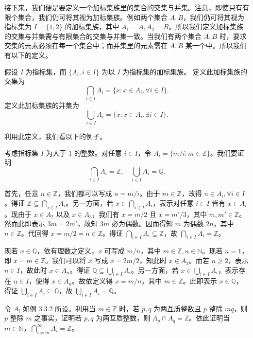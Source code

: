 接下来，我们便是要定义一个加标集族里的集合的交集与并集。注意，即使只有有限个集合，我们仍可将其视为加标集族。例如两个集合 $A, B$，我们仍可将其视为指标集为 $I = \{1, 2\}$ 的加标集族，其中 $A_1 = A, A_2 = B$。所以我们定义加标集族的交集与并集需与有限集合的交集与并集一致。当我们有两个集合 $A, B$ 时，要求交集的元素必须在每一个集合中；而并集里的元素需在 $A, B$ 某一个中。所以我们有以下的定义。

\begin{definition}
假设 $I$ 为指标集，而 $\{A_i, i \in I\}$ 为以 $I$ 为指标集的加标集族。
定义此加标集族的交集为
$$ \bigcap_{i \in I} A_i = \{x : x \in A_i, \forall i \in I\}. $$
定义此加标集族的并集为
$$ \bigcup_{i \in I} A_i = \{x : x \in A_i, \exists i \in I\}. $$
\end{definition}

利用此定义，我们看以下的例子。

\begin{example}
考虑指标集 $I$ 为大于 $1$ 的整数。对任意 $i \in I$，令 $A_i = \{m/i : m \in \mathbb{Z}\}$。我们要证明
$$ \bigcap_{i \in I} A_i = \mathbb{Z}, \quad \bigcup_{i \in I} A_i = \mathbb{Q}. $$
\end{example}
首先，任意 $n \in \mathbb{Z}$，我们都可以写成 $n = ni/i$。由于 $ni \in \mathbb{Z}$，故得 $n \in A_i, \forall i \in I$。得证 $\mathbb{Z} \subseteq \bigcap_{i \in I} A_i$。另一方面，若 $x \in \bigcap_{i \in I} A_i$，表示对任意 $i \in I$ 皆有 $x \in A_i$。现由于 $x \in A_2$ 以及 $x \in A_3$，我们有 $x = m/2$ 且 $x = m'/3$，其中 $m, m' \in \mathbb{Z}$。然而此即表示 $3m = 2m'$，故知 $3m$ 必为偶数。因而得知 $m$ 为偶数 $2n$，其中 $n \in \mathbb{Z}$。代回得 $x = m/2 = n \in \mathbb{Z}$。得证 $\bigcap_{i \in I} A_i \subseteq \mathbb{Z}$，故 $\bigcap_{i \in I} A_i = \mathbb{Z}$。

现若 $x \in \mathbb{Q}$，依有理数之定义，$x$ 可写成 $m/n$，其中 $m \in \mathbb{Z}, n \in \mathbb{N}$。现若 $n = 1$，即 $x = m \in \mathbb{Z}$。我们可以将 $x$ 写成 $x = 2m/2$，知此时 $x \in A_2$。而若 $n \geq 2$，表示 $n \in I$，故此时 $x \in A_n$。得证 $\mathbb{Q} \subseteq \bigcup_{i \in I} A_i$。另一方面，若 $x \in \bigcup_{i \in I} A_i$，表示存在 $n \in I$，使得 $x \in A_n$。故依定义得 $x = m/n$，其中 $m \in \mathbb{Z}$。此即表示 $x \in \mathbb{Q}$，得证 $\bigcup_{i \in I} A_i \subseteq \mathbb{Q}$，故 $\bigcup_{i \in I} A_i = \mathbb{Q}$。

\begin{question}
令 $A_i$ 如例 3.3.2 所设。利用当 $m \in \mathbb{Z}$ 时，若 $p, q$ 为两互质整数且 $p$ 整除 $mq$，则 $p$ 整除 $m$ 之事实，证明若 $p, q$ 为两互质整数，则 $A_p \cap A_q = \mathbb{Z}$。依此证明当 $m \in \mathbb{N}$，$\bigcap_{i=m}^{\infty} A_i = \mathbb{Z}$。
\end{question}

